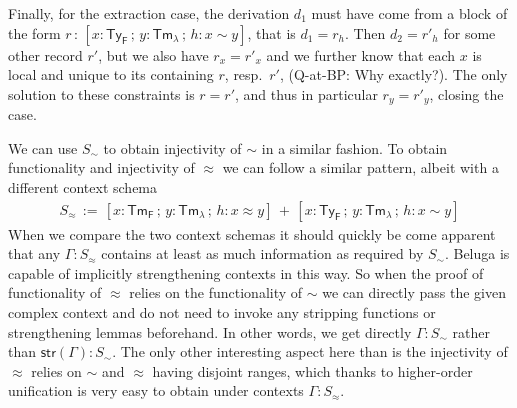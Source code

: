 \documentclass[a4paper,UKenglish]{lipics-v2016}
\newcommand{\ms}{\,}
\newcommand{\mrel}[1]{\mathrel{\ms #1 \ms}}
\newcommand{\OF}{\mrel{:}}
\newcommand{\eqdef}{\mrel{:=}}
\newcommand{\TyF}{\ensuremath{\mathsf{Ty_{F}}}}
\newcommand{\TmF}{\ensuremath{\mathsf{Tm_{F}}}}
\newcommand{\TmL}{\ensuremath{\mathsf{Tm_{\lambda}}}}
\newcommand{\of}{\ensuremath{\!:\!}}
\newcommand{\tyr}{\mathrel{\sim}}
\newcommand{\tmr}{\mathrel{\approx}}
\begin{document}
Finally, for the extraction case, the derivation $d_1$ must have come from a block of the form $r \OF [x\of\TyF \mrel{;} y\of\TmL \mrel{;} h \of x \tyr y]$, that is $d_1 = r_h$.
Then $d_2 = r'_h$ for some other record $r'$, but we also have $r_x = r'_x$ and we further know that each $x$ is local and unique to its containing $r$, resp.\ $r'$, (Q-at-BP: Why exactly?).
The only solution to these constraints is $r = r'$, and thus in particular $r_y = r'_y$, closing the case.

We can use $S_{\tyr}$ to obtain injectivity of $\tyr$ in a similar fashion.
To obtain functionality and injectivity of $\tmr$ we can follow a similar pattern, albeit with a different context schema
\begin{align*}
  S_{\tmr} \eqdef [x\of\TmF \mrel{;} y\of\TmL \mrel{;} h\of x \tmr y] \mrel{+} [x\of\TyF \mrel{;} y\of\TmL \mrel{;} h\of x \tyr y]
\end{align*}
When we compare the two context schemas it should quickly be come apparent that any $\Gamma \of S_{\tmr}$ contains at least as much information as required by $S_{\tyr}$.
Beluga is capable of implicitly strengthening contexts in this way.
So when the proof of functionality of $\tmr$ relies on the functionality of $\tyr$ we can directly pass the given complex context and do not need to invoke any stripping functions or strengthening lemmas beforehand.
In other words, we get directly $\Gamma \of S_{\tyr}$ rather than $\mathsf{str}(\Gamma) \of S_{\tyr}$.
The only other interesting aspect here than is the injectivity of $\tmr$ relies on $\tyr$ and $\tmr$ having disjoint ranges, which thanks to higher-order unification is very easy to obtain under contexts $\Gamma \of S_{\tmr}$.
\end{document}
